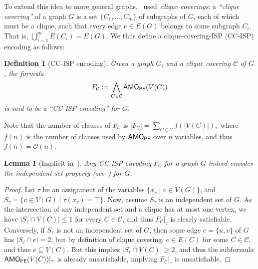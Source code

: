 \documentclass[11pt]{article}
\newtheorem{lemma}[theorem]{Lemma}
\newtheorem{definition}[theorem]{Definition}
\renewcommand{\O}{\mathcal{O}}
\begin{document}
To extend this idea to more general graphs,~\citet{ignatievCardinalityEncodingsGraph2017} used~\emph{clique coverings}: a \emph{``clique covering''} of a graph $G$ is a set $\{C_1, \ldots, C_m\}$ of subgraphs of $G$, each of which must be a clique, such that every edge $e \in E(G)$ belongs to some subgraph $C_i$. That is, $\bigcup_{i=1}^m E(C_i) = E(G)$.
We thus define a clique-covering-ISP (CC-ISP) encoding as follows:
\begin{definition}[CC-ISP encoding]
    Given a graph $G$, and a clique covering $\mathcal{C}$ of $G$, the formula 
    \[
        F_\mathcal{C} := \bigwedge_{C \in \mathcal{C}} \textsf{AMO}_{\textsf{PE}}(V(C))
    \]
    is said to be a ``CC-ISP encoding'' for $G$.  
\end{definition}
Note that the number of clauses of $F_\mathcal{C}$ is 
\(
|F_\mathcal{C}| = \sum_{C \in \mathcal{C}} f(|V(C)|),
\)
where $f(n)$ is the number of clauses used by $\textsf{AMO}_{\textsf{PE}}$ over $n$ variables, and thus $f(n) = \O(n)$.
\begin{lemma}[Implicit in~\citet{ignatievCardinalityEncodingsGraph2017}]\label{lemma:clique_encoding}
    Any CC-ISP encoding $F_\mathcal{C}$ for a graph $G$ indeed encodes the independent-set property (see~) for $G$.
\end{lemma}
\begin{proof}
    Let $\tau$ be an assignment of the variables $\{x_v \mid v \in V(G)\}$, and $S_\tau = \{v \in V(G) \mid \tau(x_v) = \top\}$.
    Now, assume $S_\tau$ is an independent set of $G$. As the intersection of any independent set and a clique has at most one vertex, we have $|S_\tau \cap V(C)| \leq 1$ for every $C \in \mathcal{C}$, and thus
    $F_\mathcal{C}|_\tau$ is clearly satisfiable. Conversely, if $S_\tau$ is not an independent set of $G$, then some edge $e = \{u, v\}$ of $G$ has $|S_\tau \cap e| = 2$, but by definition of clique covering, $e \in E(C)$ for some $C \in \mathcal{C}$, and thus $e \subseteq V(C)$. But this implies
    $|S_\tau \cap V(C)| \geq 2$, and thus the subformula $\textsf{AMO}_{\textsf{PE}}(V(C))|_\tau$ is already unsatisfiable, implying $F_\mathcal{C}|_\tau$ is unsatisfiable.
\end{proof}
\end{document}
